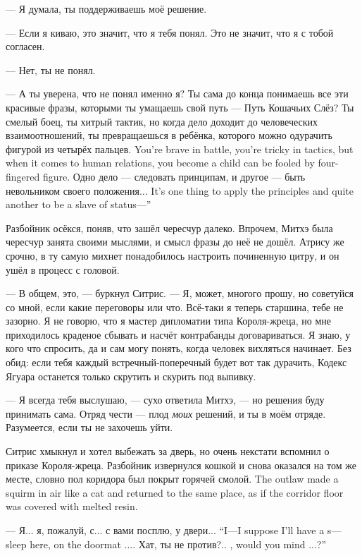 --- Я думала, ты поддерживаешь моё решение.

--- Если я киваю, это значит, что я тебя понял.
Это не значит, что я с тобой согласен.

--- Нет, ты не понял.

--- А ты уверена, что не понял именно я?
Ты сама до конца понимаешь все эти красивые фразы, которыми ты умащаешь свой путь --- Путь Кошачьих Слёз?
{Ты смелый боец, ты хитрый тактик, но когда дело доходит до человеческих взаимоотношений, ты превращаешься в ребёнка, которого можно одурачить фигурой из четырёх пальцев.}
{You're brave in battle, you're tricky in tactics, but when it comes to human relations, you become a child can be fooled by four-fingered figure.}
{Одно дело --- следовать принципам, и другое --- быть невольником своего положения...}
{It's one thing to apply the principles and quite another to be a slave of status---''}

Разбойник осёкся, поняв, что зашёл чересчур далеко.
Впрочем, Митхэ была чересчур занята своими мыслями, и смысл фразы до неё не дошёл.
Атрису же срочно, в ту самую михнет понадобилось настроить починенную цитру, и он ушёл в процесс с головой.

--- В общем, это, --- буркнул Ситрис.
--- Я, может, многого прошу, но советуйся со мной, если какие переговоры или что.
Всё-таки я теперь старшина, тебе не зазорно.
Я не говорю, что я мастер дипломатии типа Короля-жреца, но мне приходилось краденое сбывать и насчёт контрабанды договариваться.
Я знаю, у кого что спросить, да и сам могу понять, когда человек вихляться начинает.
Без обид: если тебя каждый встречный-поперечный будет вот так дурачить, Кодекс Ягуара останется только скрутить и скурить под выпивку.

--- Я всегда тебя выслушаю, --- сухо ответила Митхэ, --- но решения буду принимать сама.
Отряд чести --- плод \emph{моих} решений, и ты в моём отряде.
Разумеется, если ты не захочешь уйти.

Ситрис хмыкнул и хотел выбежать за дверь, но очень некстати вспомнил о приказе Короля-жреца.
{Разбойник извернулся кошкой и снова оказался на том же месте, словно пол коридора был покрыт горячей смолой.}
{The outlaw made a squirm in air like a cat and returned to the same place, as if the corridor floor was covered with melted resin.}

{--- Я... я, пожалуй, с... с вами посплю, у двери...}
{``I---I suppose I'll have a s---sleep here, on the doormat ....}
{Хат, ты не против?..}
{\tHat, would you mind ...?''}

